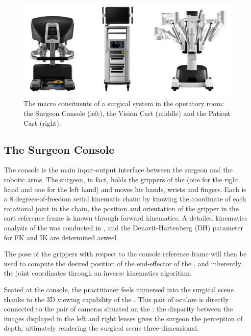 \documentclass[../main.tex]{subfiles}
\begin{document}
\begin{figure}[h!]
    \centering
    \includegraphics[width=\textwidth]{images/davinci_system.jpg}
    \caption{The macro consituents of a \davinci surgical system in the operatory room: the Surgeon Console (left), the Vision Cart (middle) and the Patient Cart (right).}
    \label{fig:davincisystem}
\end{figure}

\subsection{The Surgeon Console}
The console is the main input-output interface between the surgeon and the robotic arms. The surgeon, in fact, holds the grippers of the \mtms (one for the right hand and one for the left hand) and moves his hands, wrists and fingers. Each \mtm is a 8 degrees-of-freedom serial kinematic chain: by knowing the coordinate of each rotational joint in the chain, the position and orientation of the gripper in the cart reference frame is known through forward kinematics. A detailed kinematics analysis of the \davinci was conducted in \cite{Fontanelli2017}, and the Denavit-Hartenberg (DH) parameter for FK and IK are determined asweel. 

The pose of the \mtms grippers with respect to the console reference frame will then be used to compute the desired position of the end-effector of the \psms, and inherently the joint coordinates through an inverse kinematics algorithm.

Seated at the console, the practitioner feels immersed into the surgical scene thanks to the 3D viewing capability of the \hrsv. This pair of oculars is directly connected to the pair of cameras situated on the \ecm: the disparity between the images displayed in the left and right lenses gives the surgeon the perception of depth, ultimately rendering the surgical scene three-dimensional. 
\end{document}
